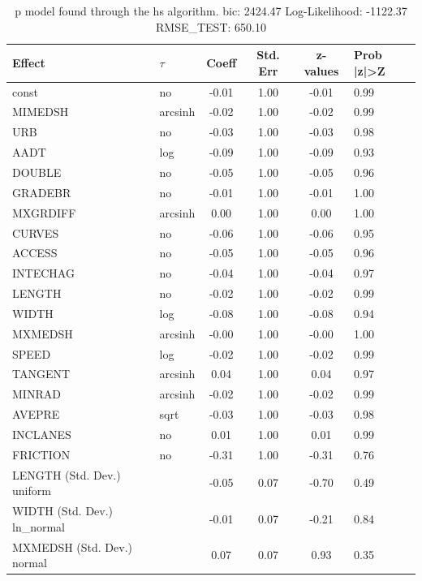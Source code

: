 \begin{table}
	\caption{p model found through the hs algorithm. bic: 2424.47 Log-Likelihood: -1122.37 RMSE_TEST: 650.10}
	\begin{center}
		\begin{tabular}{|l|l|c|c|c|l|}
			\hline
			Effect & $\tau$ & Coeff & Std. Err & z-values & Prob |z|>Z \\
			\hline
			const & no & -0.01 & 1.00 & -0.01 & 0.99 \\
			\hline
			MIMEDSH & arcsinh & -0.02 & 1.00 & -0.02 & 0.99 \\
			\hline
			URB & no & -0.03 & 1.00 & -0.03 & 0.98 \\
			\hline
			AADT & log & -0.09 & 1.00 & -0.09 & 0.93 \\
			\hline
			DOUBLE & no & -0.05 & 1.00 & -0.05 & 0.96 \\
			\hline
			GRADEBR & no & -0.01 & 1.00 & -0.01 & 1.00 \\
			\hline
			MXGRDIFF & arcsinh & 0.00 & 1.00 & 0.00 & 1.00 \\
			\hline
			CURVES & no & -0.06 & 1.00 & -0.06 & 0.95 \\
			\hline
			ACCESS & no & -0.05 & 1.00 & -0.05 & 0.96 \\
			\hline
			INTECHAG & no & -0.04 & 1.00 & -0.04 & 0.97 \\
			\hline
			LENGTH & no & -0.02 & 1.00 & -0.02 & 0.99 \\
			\hline
			WIDTH & log & -0.08 & 1.00 & -0.08 & 0.94 \\
			\hline
			MXMEDSH & arcsinh & -0.00 & 1.00 & -0.00 & 1.00 \\
			\hline
			SPEED & log & -0.02 & 1.00 & -0.02 & 0.99 \\
			\hline
			TANGENT & arcsinh & 0.04 & 1.00 & 0.04 & 0.97 \\
			\hline
			MINRAD & arcsinh & -0.02 & 1.00 & -0.02 & 0.99 \\
			\hline
			AVEPRE & sqrt & -0.03 & 1.00 & -0.03 & 0.98 \\
			\hline
			INCLANES & no & 0.01 & 1.00 & 0.01 & 0.99 \\
			\hline
			FRICTION & no & -0.31 & 1.00 & -0.31 & 0.76 \\
			\hline
			LENGTH (Std. Dev.) uniform &  & -0.05 & 0.07 & -0.70 & 0.49 \\
			\hline
			WIDTH (Std. Dev.) ln_normal &  & -0.01 & 0.07 & -0.21 & 0.84 \\
			\hline
			MXMEDSH (Std. Dev.) normal &  & 0.07 & 0.07 & 0.93 & 0.35 \\

\end{tabular}
\end{center}
\end{table}
